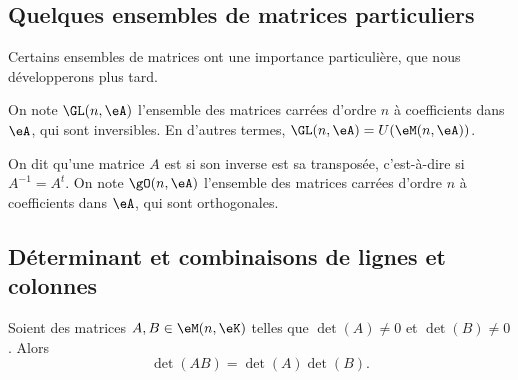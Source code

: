 \subsection{Quelques ensembles de matrices particuliers}
Certains ensembles de matrices ont une importance particulière, que nous développerons plus tard.

\begin{definition}
	On note \( \GL(n,\eA) \) l'ensemble des matrices carrées d'ordre \( n \) à coefficients dans \( \eA \), qui sont inversibles. En d'autres termes, \( \GL(n,\eA) = U (\eM (n,\eA) ) \).
\end{definition}

\begin{definition}\label{DefMatriceOrthogonale}
	On dit qu'une matrice \( A \) est  si son inverse est sa transposée, c'est-à-dire si \( A^{-1} = A^t \). On note \( \gO(n,\eA) \) l'ensemble des matrices carrées d'ordre \( n \) à coefficients dans \( \eA \), qui sont orthogonales.
\end{definition}

\subsection{Déterminant et combinaisons de lignes et colonnes}
\label{SUBSECooKMSVooBBHwkH}

\begin{proposition}     \label{PROPooUCZVooPkloQp}
	Soient des matrices \( A,B\in \eM(n,\eK)\) telles que \( \det(A)\neq 0\) et \( \det(B)\neq 0\). Alors
	\begin{equation}
		\det(AB)=\det(A)\det(B).
	\end{equation}
\end{proposition}


